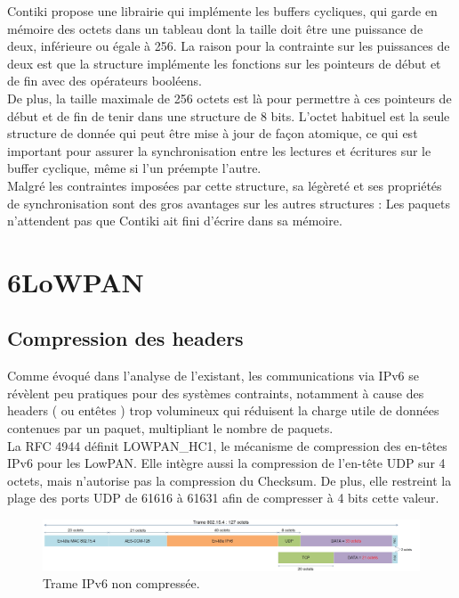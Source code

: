 				Contiki propose une librairie qui implémente les buffers cycliques, qui garde en mémoire des octets dans un tableau dont la taille doit être une puissance de deux, inférieure ou égale à 256. La raison pour la contrainte sur les puissances de deux est que la structure implémente les fonctions sur les pointeurs de début et de fin avec des opérateurs booléens.\\
				De plus, la taille maximale de 256 octets est là pour permettre à ces pointeurs de début et de fin de tenir dans une structure de 8 bits. L'octet habituel est la seule structure de donnée qui peut être mise à jour de façon atomique, ce qui est important pour assurer la synchronisation entre les lectures et écritures sur le buffer cyclique, même si l'un préempte l'autre.\\
				
				Malgré les contraintes imposées par cette structure, sa légèreté et ses propriétés de synchronisation sont des gros avantages sur les autres structures : Les paquets n'attendent pas que Contiki ait fini d'écrire dans sa mémoire.
	
\section{6LoWPAN}
	\subsection{Compression des headers}
		Comme évoqué dans l'analyse de l'existant, les communications via IPv6 se révèlent peu pratiques pour des systèmes contraints, notamment à cause des headers ( ou entêtes ) trop volumineux qui réduisent la charge utile de données contenues par un paquet, multipliant le nombre de paquets. \\
		La RFC 4944 définit LOWPAN\_HC1, le mécanisme de compression des en-têtes IPv6 pour les LowPAN. Elle intègre aussi la compression de l'en-tête UDP sur 4 octets, mais n'autorise pas la compression du Checksum. De plus, elle restreint la plage des ports UDP de 61616 à 61631 afin de compresser à 4 bits cette valeur.
		
		\begin{figure}[htp]
			\centering
			\includegraphics[width=16cm]{images/TramePasComp.jpg}
			\caption{Trame IPv6 non compressée.}
			\label{fig:tramepascomp}
		\end{figure}
		
